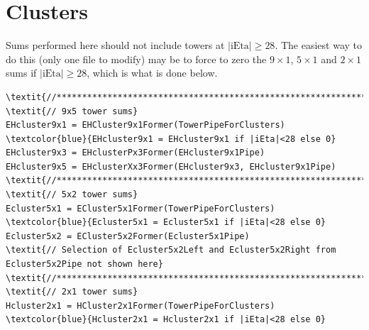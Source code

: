 \documentclass[a4paper, 12pt]{article}
\begin{document}
\section{Clusters}
Sums performed here should not include towers at $|\textrm{iEta}|\geq28$. The easiest way to do this (only one file to modify) may be to force to zero the $9\times1$, $5\times1$ and $2\times1$ sums if $|\textrm{iEta}|\geq28$, which is what is done below.

\begin{Verbatim}[label={Isolation energy sums}]
\textit{//******************************************************************//}
\textit{// 9x5 tower sums}
EHcluster9x1 = EHCluster9x1Former(TowerPipeForClusters)
\textcolor{blue}{EHcluster9x1 = EHcluster9x1 if |iEta|<28 else 0}
EHcluster9x3 = EHclusterPx3Former(EHcluster9x1Pipe)
EHcluster9x5 = EHclusterXx3Former(EHcluster9x3, EHcluster9x1Pipe)
\textit{//******************************************************************//}
\textit{// 5x2 tower sums}
Ecluster5x1 = ECluster5x1Former(TowerPipeForClusters)
\textcolor{blue}{Ecluster5x1 = Ecluster5x1 if |iEta|<28 else 0}
Ecluster5x2 = ECluster5x2Former(Ecluster5x1Pipe)
\textit{// Selection of Ecluster5x2Left and Ecluster5x2Right from Ecluster5x2Pipe not shown here}
\textit{//******************************************************************//}
\textit{// 2x1 tower sums}
Hcluster2x1 = HCluster2x1Former(TowerPipeForClusters)
\textcolor{blue}{Hcluster2x1 = Hcluster2x1 if |iEta|<28 else 0}
\end{Verbatim}
\end{document}
